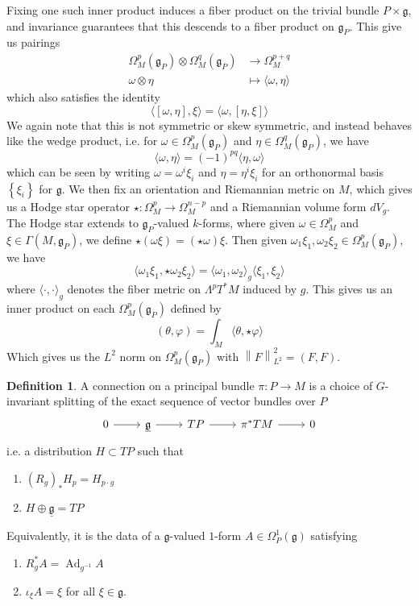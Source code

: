 \documentclass[psamsfonts, 12pt]{amsart}
\theoremstyle{definition}
\newtheorem{defn}[thm]{Definition}
\theoremstyle{remark}
\newcommand{\g}{\mathfrak{g}}
\newcommand{\inv}{^{-1}}
\newcommand{\set}[1]{\left\lbrace #1 \right\rbrace}
\newcommand{\norm}[1]{\left\lVert#1\right\rVert}
\DeclareMathOperator{\Ad}{Ad}
\begin{document}
Fixing one such inner product induces a fiber product on the trivial bundle
$P \times \g$, and invariance guarantees that this descends to a fiber product on
$\g_P$. This give us pairings
\begin{align*}
\Omega^p_M(\g_P) \otimes \Omega^q_M(\g_P) &\to \Omega^{p+q}_M \\
\omega \otimes \eta &\mapsto \langle \omega, \eta \rangle
\end{align*}
%
which also satisfies the identity
\[
\langle[\omega,\eta],\xi\rangle = \langle \omega,[\eta,\xi]\rangle
\]
We again note that this is not symmetric or skew symmetric, and instead behaves
like the wedge product, i.e. for $\omega \in \Omega^p_M(\g_P)$ and
$\eta \in \Omega^q_M(\g_P)$, we have
\[
\langle \omega,\eta \rangle = (-1)^{pq}\langle \eta,\omega\rangle
\]
which can be seen by writing $\omega = \omega^i\xi_i$ and $\eta = \eta^i\xi_i$
for an orthonormal basis $\set{\xi_i}$ for $\g$.
%
We then fix an orientation and Riemannian metric on $M$, which gives us a Hodge
star operator $\star : \Omega^p_M \to \Omega^{n-p}_M$ and a Riemannian volume form
$dV_g$. The Hodge star extends to $\g_P$-valued $k$-forms, where given
$\omega \in \Omega^p_M$ and $\xi \in \Gamma(M,\g_P)$, we define
$\star(\omega\xi) = (\star\omega)\xi$. Then given
$\omega_1\xi_1,\omega_2\xi_2 \in \Omega^p_M(\g_P)$, we have
\[
\langle\omega_1\xi_1,\star\omega_2\xi_2\rangle =
\langle \omega_1,\omega_2\rangle_g\langle\xi_1,\xi_2\rangle
\]
where $\langle\cdot,\cdot\rangle_g$ denotes the fiber metric on $\Lambda^pT^*M$
induced by $g$. This gives us an inner product on each $\Omega^p_M(\g_P)$ defined
by
\[
(\theta,\varphi) = \int_M \langle \theta,\star\varphi\rangle
\]
Which gives us the $L^2$ norm on $\Omega^p_M(\g_P)$ with $\norm{F}_{L^2}^2 = (F,F)$.
\begin{defn}
A connection on a principal bundle $\pi : P \to M$ is a choice of $G$-invariant splitting
of the exact sequence of vector bundles over $P$
\[\begin{tikzcd}
0 \ar[r] & \underline{\g} \ar[r] & TP \ar[r] & \pi^*TM \ar[r] & 0
\end{tikzcd}\]
i.e. a distribution $H \subset TP$ such that
\begin{enumerate}
  \item $(R_g)_*H_p = H_{p\cdot g}$
  \item $H \oplus \underline{\g} = TP$
\end{enumerate}
Equivalently, it is the data of a $\g$-valued $1$-form $A \in \Omega^1_P(\g)$
satisfying
\begin{enumerate}
  \item $R_g^*A = \Ad_{g\inv} A$
  \item $\iota_\xi A = \xi$ for all $\xi \in \g$.
\end{enumerate}
\end{defn}
\end{document}
